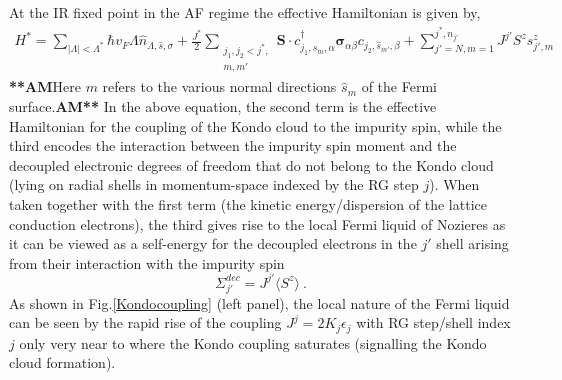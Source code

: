 \documentclass[aps,prl,preprint,groupedaddress]{revtex4-2}
\begin{document}
\par\noindent
At the IR fixed point in the AF regime the effective Hamiltonian is given by,
\begin{eqnarray}
H^{*}=\sum_{|\Lambda|<\Lambda^{*}}\hbar v_{F}\Lambda\hat{n}_{\Lambda,\hat{s},\sigma}+\frac{J^{*}}{2}\sum_{\substack{j_{1},j_{2}<j^{*},\\ m,m'}}\mathbf{S}\cdot c^{\dagger}_{j_{1},\hat{s}_{m},\alpha}\boldsymbol{\sigma}_{\alpha\beta}c_{j_{2},\hat{s}_{m'},\beta}+\sum_{j'=N,m=1}^{j^{*},n_{j'}}J^{j'}S^{z}s^{z}_{j',m}\label{fixedPointHam}
\end{eqnarray} 
\textbf{**AM}Here $m$ refers to the various normal directions $\hat{s}_{m}$ of the Fermi surface.\textbf{AM**}
In the above equation, the second term is the effective Hamiltonian for the coupling of the Kondo cloud to the impurity spin, while the third encodes the interaction between the impurity spin moment and the decoupled electronic degrees of freedom that do not belong to the Kondo cloud (lying on radial shells in momentum-space indexed by the RG step $j$). When taken together with the first term (the kinetic energy/dispersion of the lattice conduction electrons), the third gives rise to the local Fermi liquid of Nozieres as it can be viewed as a self-energy for the decoupled electrons in the $j'$ shell arising from their interaction with the impurity spin
\begin{equation}
\Sigma^{dec}_{j'} = J^{j'}\langle S^{z}\rangle~.  
\end{equation}
As shown in Fig.\ref{Kondocoupling} (left panel), the local nature of the Fermi liquid can be seen by the rapid rise of the coupling $J^{j}=2K_{j}\epsilon_{j}$ with RG step/shell index $j$ only very near to where the Kondo coupling saturates (signalling the Kondo cloud formation).
\end{document}
